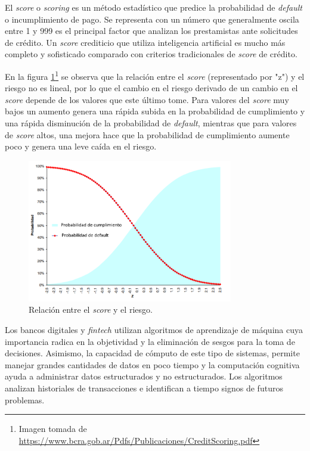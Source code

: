 El \textit{score} o \textit{scoring} es un método estadístico que predice la probabilidad de \textit{default} o incumplimiento de pago. Se representa con un número que generalmente oscila entre 1 y 999 es el principal factor que analizan los prestamistas ante solicitudes de crédito. Un \textit{score} crediticio que utiliza inteligencia artificial es mucho más completo y sofisticado comparado con criterios tradicionales de \textit{score} de crédito.

En la figura \ref{fig:Figura3}\footnote{Imagen tomada de \url{https://www.bcra.gob.ar/Pdfs/Publicaciones/CreditScoring.pdf}} se observa que  la relación entre el \textit{score} (representado por "z") y el riesgo no es lineal, por lo que el cambio en el riesgo derivado de un cambio en el \textit{score} depende de los valores que este último tome. Para valores del \textit{score} muy bajos un aumento genera una rápida subida en la probabilidad de cumplimiento y una rápida disminución de la probabilidad de \textit{default}, mientras que para valores de \textit{score} altos, una mejora hace que la probabilidad de cumplimiento aumente poco y genera una leve caída en el riesgo.

\vspace{1cm}
\begin{figure}[htbp]
	\centering
	\includegraphics[width=0.8\textwidth]{./Figures/Figura3.png}
	\caption{Relación entre el \textit{score} y el riesgo. 						}
	\label{fig:Figura3}
\end{figure}
\vspace{1cm}

\vspace{1cm}


Los bancos digitales y \textit{fintech} utilizan algoritmos de aprendizaje de máquina cuya importancia radica en la objetividad y la eliminación de sesgos para la toma de decisiones. Asimismo, la capacidad de cómputo de este tipo de sistemas, permite manejar grandes cantidades de datos en poco tiempo y la computación cognitiva ayuda a administrar datos estructurados y no estructurados. Los algoritmos analizan historiales de transacciones e identifican a tiempo signos de futuros problemas.

